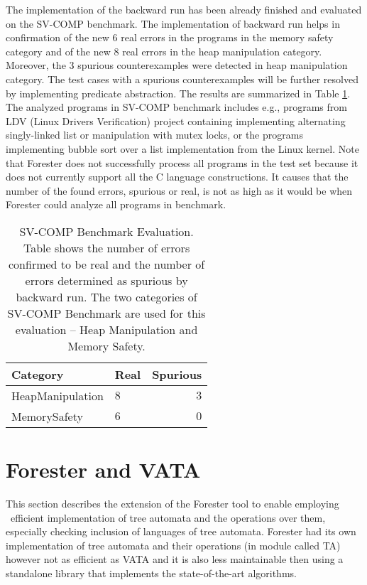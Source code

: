 \documentclass[fleqn,11pt]{ExcelAtFIT} %
\begin{document}
The implementation of the backward run has been already finished and evaluated on the SV-COMP benchmark.
The implementation of backward run helps in confirmation of the new $6$ real errors in the programs in the memory safety category and
of the new $8$ real errors in the heap manipulation category.
Moreover, the $3$ spurious counterexamples were detected in heap manipulation category.
The test cases with a spurious counterexamples will be further resolved by implementing predicate
abstraction.
The results are summarized in Table \ref{tab:bwres}.
The analyzed programs in SV-COMP benchmark includes e.g., programs from LDV (Linux Drivers Verification) project
containing implementing alternating singly-linked list or manipulation with mutex locks, or the programs
implementing bubble sort over a list implementation from the Linux kernel.
Note that Forester does not successfully process all programs in the test set
because it does not currently support all the C language constructions.
It causes that the number of the found errors, spurious or real, is not as high as it would be when
Forester could analyze all programs in benchmark.

\begin{table}[bu]
	\vskip6pt
	\caption{SV-COMP Benchmark Evaluation. Table shows the number of errors confirmed
	to be real and the number of errors determined as spurious by backward run.
	The two categories of SV-COMP Benchmark are used for this evaluation -- Heap Manipulation and Memory Safety.}
	\centering
	\begin{tabular}{llr}
		\toprule
		Category & Real & Spurious \\
		\midrule
		HeapManipulation & $8$ & $3$ \\
		MemorySafety & $6$ & $0$ \\
		\bottomrule
	\end{tabular}
	\label{tab:bwres}
\end{table}


\section{Forester and VATA}
\label{sec:forvata}

This section describes the extension of the Forester tool to enable employing \vata\ 
efficient implementation of	tree automata and the operations over them,
especially checking inclusion of languages of tree automata.
Forester had its own implementation of tree automata and their operations (in module called TA)
however not as efficient as VATA and it is also less maintainable
then using a standalone library that implements the state-of-the-art algorithms.
\end{document}
